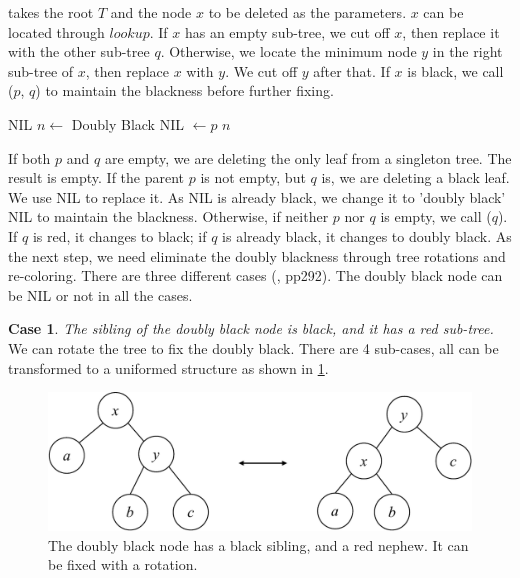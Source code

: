 \documentclass[b5paper]{article}
\begin{document}
 takes the root $T$ and the node $x$ to be deleted as the parameters. $x$ can be located through $lookup$. If $x$ has an empty sub-tree, we cut off $x$, then replace it with the other sub-tree $q$. Otherwise, we locate the minimum node $y$ in the right sub-tree of $x$, then replace $x$ with $y$. We cut off $y$ after that. If $x$ is black, we call ($p$, $q$) to maintain the blackness before further fixing.

\begin{algorithmic}[1]
    \State \Return NIL 
    \State $n \gets$ Doubly Black NIL
    \State {} $\gets p$
    \State \Return $n$
  \Else
    \State \Return {}
  \EndIf
\EndFunction
\end{algorithmic}

If both $p$ and $q$ are empty, we are deleting the only leaf from a singleton tree. The result is empty. If the parent $p$ is not empty, but $q$ is, we are deleting a black leaf. We use NIL to replace it. As NIL is already black, we change it to 'doubly black' NIL to maintain the blackness. Otherwise, if neither $p$ nor $q$ is empty, we call ($q$). If $q$ is red, it changes to black; if $q$ is already black, it changes to doubly black. As the next step, we need eliminate the doubly blackness through tree rotations and re-coloring. There are three different cases (\cite{CLRS}, pp292). The doubly black node can be NIL or not in all the cases.

\textbf{Case 1}. {\em The sibling of the doubly black node is black, and it has a red sub-tree.} We can rotate the tree to fix the doubly black. There are 4 sub-cases, all can be transformed to a uniformed structure as shown in \cref{fig:del-case1}.

\begin{figure}[htbp]
   \centering
   \includegraphics[scale=0.4, page=3]{../../../datastruct/tree/red-black-tree/img/rbtree}
   \caption{The doubly black node has a black sibling, and a red nephew. It can be fixed with a rotation.}
   \label{fig:del-case1}
\end{figure}
\end{document}

